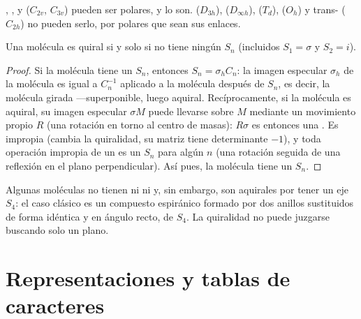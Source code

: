 \begin{example}[Polar o no]\label{ex:b3:point-groups:polar}
, ,  y  ($C_{2v}$, $C_{3v}$) pueden ser polares, y
lo son.  ($D_{3h}$),  ($D_{\infty h}$),  ($T_d$),  ($O_h$)
y trans- ($C_{2h}$) no pueden serlo, por polares que sean sus enlaces.
\end{example}

\begin{theorem}\label{thm:b3:point-groups:chiral}
Una molécula es quiral si y solo si no tiene ningún  $S_n$
(incluidos $S_1 = \sigma$ y $S_2 = i$).
\end{theorem}

\begin{proof}
Si la molécula tiene un $S_n$, entonces $S_n = \sigma_hC_n$: la imagen especular $\sigma_h$
de la molécula es igual a $C_n^{-1}$ aplicado a la molécula después de $S_n$, es decir,
la molécula girada ---superponible, luego aquiral. Recíprocamente, si la
molécula es aquiral, su imagen especular $\sigma M$ puede llevarse sobre $M$ mediante un
movimiento propio $R$ (una rotación en torno al centro de masas): $R\sigma$ es entonces una
. Es impropia (cambia la quiralidad, su matriz tiene
determinante $-1$), y toda operación impropia de un  es un
$S_n$ para algún $n$ (una rotación seguida de una reflexión en el plano
perpendicular). Así pues, la molécula tiene un $S_n$.
\end{proof}

\begin{example}\label{ex:b3:point-groups:s4}
Algunas moléculas no tienen ni  ni  y, sin embargo,
son aquirales por tener un eje $S_4$: el caso clásico es un compuesto espiránico
formado por dos anillos sustituidos de forma idéntica y en ángulo recto, de  $S_4$. La quiralidad no puede juzgarse buscando solo un plano.
\end{example}

\section{Representaciones y tablas de caracteres}


